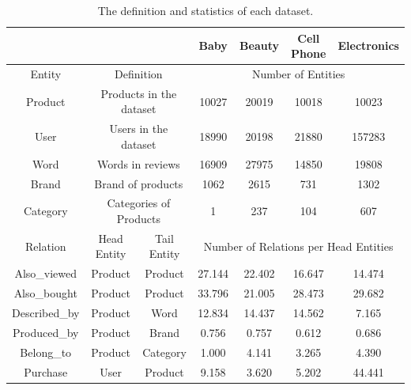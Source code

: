 \documentclass[review]{elsarticle}
\begin{document}
\begin{sloppypar}
\begin{table}[]
\centering
\footnotesize
\caption{The definition and statistics of each dataset.}
\begin{tabular}{c|cc|cccc}
\hline
\multicolumn{3}{c|}{}                                                     & Baby       & Beauty     & Cell Phone     & Electronics    \\ \hline
Entity        & \multicolumn{2}{c|}{Definition}                           & \multicolumn{4}{c}{Number of Entities}                    \\ \hline
Product       & \multicolumn{2}{c|}{Products in the dataset}              & 10027      & 20019      & 10018          & 10023          \\
User          & \multicolumn{2}{c|}{Users in the dataset}                 & 18990      & 20198      & 21880          & 157283         \\
Word          & \multicolumn{2}{c|}{Words in reviews} & 16909      & 27975      & 14850          & 19808          \\
Brand         & \multicolumn{2}{c|}{Brand of products}    & 1062       & 2615       & 731            & 1302           \\
Category      & \multicolumn{2}{c|}{Categories of Products}               & 1          & 237        & 104            & 607            \\ \hline
Relation      & Head Entity                  & Tail Entity                & \multicolumn{4}{c}{Number of Relations per Head Entities} \\ \hline
Also\_viewed  & Product                      & Product                    & 27.144     & 22.402     & 16.647         & 14.474         \\
Also\_bought  & Product                      & Product                    & 33.796     & 21.005     & 28.473         & 29.682         \\
Described\_by & Product                      & Word                       & 12.834     & 14.437     & 14.562         & 7.165          \\
Produced\_by  & Product                      & Brand                      & 0.756      & 0.757      & 0.612          & 0.686          \\
Belong\_to    & Product                      & Category                   & 1.000      & 4.141      & 3.265          & 4.390          \\
Purchase      & User                         & Product                    & 9.158      & 3.620      & 5.202          & 44.441         \\ \hline
\end{tabular}
\label{Table 1}
\end{table}




\end{sloppypar}
\end{document}
